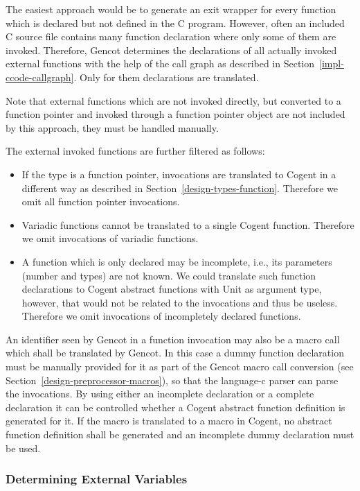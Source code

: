 The easiest approach would be to generate an exit wrapper for every function which is declared but 
not defined in the C program. However, often an
included C source file contains many function declaration where only some of them are invoked. Therefore, Gencot
determines the declarations of all actually invoked external functions with the help of the call graph as described in 
Section~\ref{impl-ccode-callgraph}. Only for them declarations are translated.

Note that external functions which are not invoked directly, but converted to a function pointer and invoked 
through a function pointer object are not included by this approach, they must be handled manually.

The external invoked functions are further filtered as follows:
\begin{itemize}
\item If the type is a function pointer, invocations are translated to Cogent in a different way as 
described in Section~\ref{design-types-function}. Therefore we omit all function pointer invocations.
\item Variadic functions cannot be translated to a single Cogent function. Therefore we omit invocations of
variadic functions.
\item A function which is only declared may be incomplete, i.e., its parameters (number and types) are not known. 
We could translate such function declarations to Cogent abstract functions with Unit as argument type, however,
that would not be related to the invocations and thus be useless. Therefore we omit invocations
of incompletely declared functions.
\end{itemize}

An identifier seen by Gencot in a function invocation may also be a macro call which shall be translated by Gencot. 
In this case a dummy function declaration must be manually provided for it as part of the Gencot macro call conversion
(see Section~\ref{design-preprocessor-macros}), so that the language-c parser can parse the invocations. By 
using either an incomplete declaration or a complete declaration it can be controlled whether a Cogent abstract 
function definition is generated for it. If the macro is translated to a macro in Cogent, no abstract function
definition shall be generated and an incomplete dummy declaration must be used.

\subsubsection{Determining External Variables}

